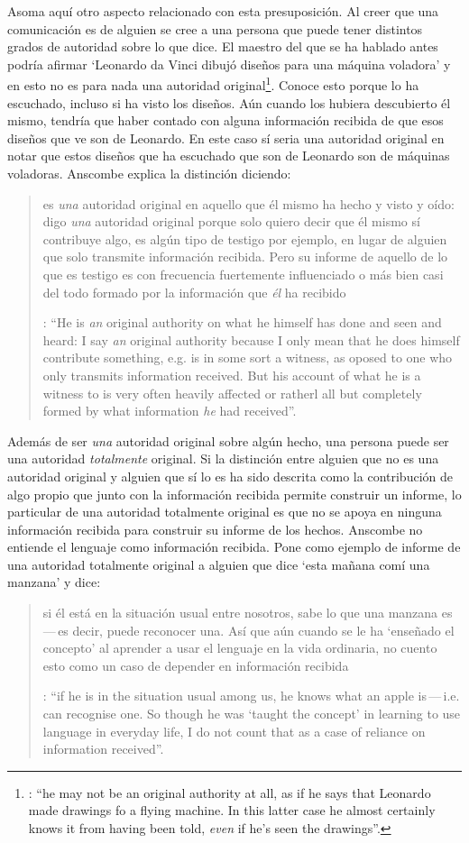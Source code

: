 Asoma aquí otro aspecto relacionado con esta presuposición. Al creer que una comunicación es de alguien se cree a una persona que puede tener distintos grados de autoridad sobre lo que dice. El maestro del que se ha hablado antes podría afirmar \enquote*{Leonardo da Vinci dibujó diseños para una máquina voladora} y en esto no es para nada una autoridad original\footnote{\cite[Cf.][6]{anscombe2008faith:tobelieve}: \enquote{he may not be an original authority at all, as if he says that Leonardo made drawings fo a flying machine. In this latter case he almost certainly knows it from having been told, \emph{even} if he's seen the drawings}.}. Conoce esto porque lo ha escuchado, incluso si ha visto los diseños. Aún cuando los hubiera descubierto él mismo, tendría que haber contado con alguna información recibida de que esos diseños que ve son de Leonardo. En este caso sí seria una autoridad original en notar que estos diseños que ha escuchado que son de Leonardo son de máquinas voladoras. Anscombe explica la distinción diciendo: \blockquote[{\Cite[5]{anscombe2008faith:tobelieve}}: \enquote{He is \emph{an} original authority on what he himself has done and seen and heard: I say \emph{an} original authority because I only mean that he does himself contribute something, e.g. is in some sort a witness, as oposed to one who only transmits information received. But his account of what he is a witness to is very often \textelp{} heavily affected or ratherl all but completely formed by what information \emph{he} had received}.]{ es \emph{una} autoridad original en aquello que él mismo ha hecho y visto y oído: digo \emph{una} autoridad original porque solo quiero decir que él mismo sí contribuye algo, es algún tipo de testigo por ejemplo, en lugar de alguien que solo transmite información recibida. Pero su informe de aquello de lo que es testigo es con frecuencia \textelp{} fuertemente influenciado o más bien casi del todo formado por la información que \emph{él} ha recibido} Además de ser \emph{una} autoridad original sobre algún hecho, una persona puede ser una autoridad \emph{totalmente} original. Si la distinción entre alguien que no es una autoridad original y alguien que sí lo es ha sido descrita como la contribución de algo propio que junto con la información recibida permite construir un informe, lo particular de una autoridad totalmente original es que no se apoya en ninguna información recibida para construir su informe de los hechos. Anscombe no entiende el lenguaje como información recibida. Pone como ejemplo de informe de una autoridad totalmente original a alguien que dice \enquote*{esta mañana comí una manzana} y dice: \blockquote[{\Cite[6]{anscombe2008faith:tobelieve}}: \enquote{if he is in the situation usual among us, he knows what an apple is\,---\,i.e. can recognise one. So though he was `taught the concept' in learning to use language in everyday life, I do not count that as a case of reliance on information received}.]{si él está en la situación usual entre nosotros, sabe lo que una manzana es\,---\,es decir, puede reconocer una. Así que aún cuando se le ha `enseñado el concepto' al aprender a usar el lenguaje en la vida ordinaria, no cuento esto como un caso de depender en información recibida}.

